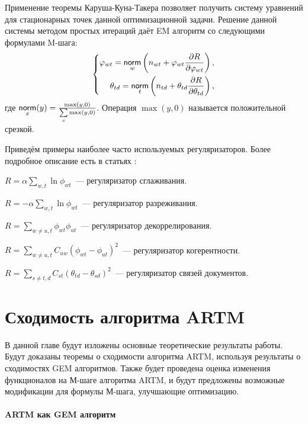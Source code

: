 \documentclass[12pt, twoside]{article}
\begin{document}
Применение теоремы Каруша-Куна-Такера позволяет получить систему уравнений для стационарных точек данной оптимизационной задачи. Решение данной системы методом простых итераций даёт EM алгоритм со следующими формулами M-шага:
\[
\left\{
	\begin{aligned}
\varphi_{wt} = \mathop{\mathsf{norm}}\limits_w  \left(n_{wt} + \varphi_{wt}\frac{\partial R}{\partial\varphi_{wt}}\right),\\
\theta_{td} = \mathop{\mathsf{norm}}\limits_t  \left(n_{td} + \theta_{td}\frac{\partial R}{\partial\theta_{td}}\right),
	\end{aligned}
\right.
\]
где $\norm_x(y) = \frac{\max(y, 0)}{\sum\limits_x \max(y, 0)}$. Операция $\max(y, 0)$ называется положительной срезкой.

Приведём примеры наиболее часто используемых регуляризаторов. Более подробное описание есть в статьях \cite{vorontsov2014additive, vorontsov2014tutorial, vorontsov2015additive}:
\begin{enumerate*}
\item $R = \alpha \sum\limits_{w, t} \ln \phi_{wt}$~--- регуляризатор сглаживания.
\item $R = -\alpha \sum\limits_{w, t} \ln \phi_{wt}$~--- регуляризатор разреживания.
\item $R = \sum\limits_{w \neq u, t} \phi_{wt} \phi_{ut}$~--- регуляризатор декоррелирования.
\item $R = \sum\limits_{w \neq u, t} C_{uw}\left( \phi_{wt}  - \phi_{ut} \right)^2$~--- регуляризатор когерентности.
\item $R = \sum\limits_{s \neq t, d} C_{st}\left( \theta_{td}  - \theta_{sd} \right)^2$~--- регуляризатор связей документов.
\end{enumerate*}


\section{Сходимость алгоритма ARTM}
	В данной главе будут изложены основные теоретические результаты работы. Будут доказаны теоремы о сходимости алгоритма ARTM, используя результаты о сходимостях GEM алгоритмов. Также будет проведена оценка изменения функционалов на М-шаге алгоритма ARTM, и будут предложены возможные модификации для формулы М-шага, улучшающие оптимизацию. 
	
\paragraph{ARTM как GEM алгоритм}
\label{subsec:artmasgem}
\end{document}
